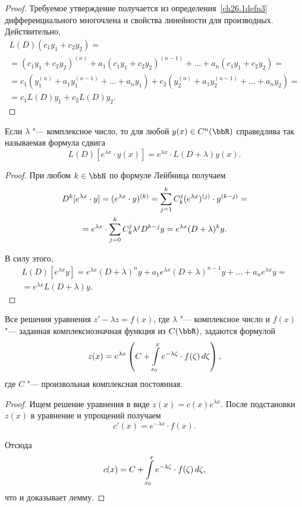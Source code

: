 \begin{proof}
Требуемое утверждение получается из определения~\ref{ch26.1defn3} дифференциального многочлена и свойства линейности для производных. Действительно,
\begin{multline*}
L(D)(c_1y_1+c_2y_2)=\\=(c_1y_1+c_2y_2)^{(n)}+a_1(c_1y_1+c_2y_2)^{(n-1)}+\dots+a_n(c_1y_1+c_2y_2)=\\=c_1(y_1^{(n)}+a_1y_1^{(n-1)}+\dots+a_ny_1)+c_2(y_2^{(n)}+a_1y_2^{(n-1)}+\dots+a_ny_2)=\\=c_1L(D)y_1+c_2L(D)y_2. \tag*{\qedhere}
\end{multline*}
\end{proof}

\begin{lemm} \label{ch26lemm1.2}
Если $\lambda$ "--- комплексное число, то для любой $y(x)\in C^n(\bbR)$ справедлива так называемая формула сдвига
$$
L(D)\left[e^{\lambda x}\cdot y(x)\right]=e^{\lambda x}\cdot L(D+\lambda)y(x).
$$
\end{lemm}
\begin{proof}
При любом $k\in \bbN$ по формуле Лейбница получаем
\begin{multline*}
D^k[e^{\lambda x}\cdot y]=(e^{\lambda x}\cdot y)^{(k)}=\sum_{j=1}^{k}\limits C_k^j(e^{\lambda x})^{(j)}\cdot y^{(k-j)}=\\=e^{\lambda x}\cdot \sum_{j=0}^{k}\limits C_k^j\lambda^jD^{k-j}y=e^{\lambda x}(D+\lambda)^ky.
\end{multline*}

В силу этого,
\begin{multline*}
L(D)[e^{\lambda x}y]=e^{\lambda x}(D+\lambda)^ny+a_1e^{\lambda x}(D+\lambda)^{n-1}y+\dots+a_ne^{\lambda x}y=\\=e^{\lambda x}L(D+\lambda)y.\tag*{\qedhere}
\end{multline*}
\end{proof}

\begin{lemm} \label{ch26lemm1.3}
Все решения уравнения $z'-\lambda z = f(x)$, где $\lambda$ "--- комплексное число и $f(x)$ "--- заданная комплекснозначная функция из $C(\bbR)$, задаются формулой	
$$
z(x)=e^{\lambda x}\left(C+ \int_{x_0}^{x}\limits e^{-\lambda\zeta}\cdot f(\zeta)\,d\zeta\right),
$$
где $C$ "--- произвольная комплексная постоянная. 
\end{lemm}

\begin{proof}
Ищем решение уравнения в виде $z(x)=c(x)e^{\lambda x}$. После подстановки $z(x)$ в уравнение и упрощений получаем 
$$
c'(x)=e^{-\lambda x}\cdot f(x).
$$

Отсюда
$$
c(x)=C+\int_{x_0}^{x}\limits e^{-\lambda\zeta}\cdot f(\zeta)\,d\zeta,
$$
что и доказывает лемму.
\end{proof}

